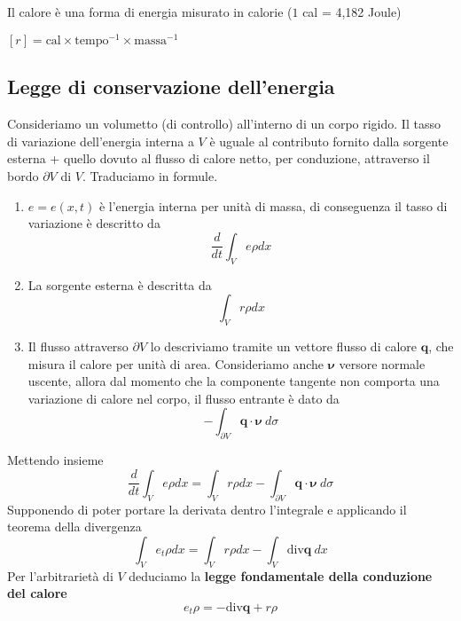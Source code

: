 \documentclass[10pt,a4paper,twoside,openright]{book}
\begin{document}
Il calore è una forma di energia misurato in calorie ($1$ cal = 4,182 Joule)

$[ r] =\text{cal} \times \text{tempo}^{-1} \times \text{massa}^{-1}$
\subsection{Legge di conservazione dell'energia}

Consideriamo un volumetto (di controllo) all'interno di un corpo rigido. Il tasso di variazione dell'energia interna a $V$ è uguale al contributo fornito dalla sorgente esterna + quello dovuto al flusso di calore netto, per conduzione, attraverso il bordo $\partial V$ di $V$. Traduciamo in formule.
\begin{enumerate}
\item $e=e(x,t)$ è l'energia interna per unità di massa, di conseguenza il tasso di variazione è descritto da\begin{equation*}
\frac{d}{dt}\int _{V} e\rho dx
\end{equation*}
\item La sorgente esterna è descritta da\begin{equation*}
\int _{V} r\rho dx
\end{equation*}
\item Il flusso attraverso $\partial V$ lo descriviamo tramite un vettore flusso di calore $\mathbf{q}$, che misura il calore per unità di area. Consideriamo anche $\displaystyle \bm{\nu}$ versore normale uscente, allora dal momento che la componente tangente non comporta una variazione di calore nel corpo, il flusso entrante è dato da\begin{equation*}
-\int _{\partial V}\mathbf{q} \cdotp \bm{\nu} \ d\sigma 
\end{equation*}
\end{enumerate}

Mettendo insieme
\begin{equation*}
\frac{d}{dt}\int _{V} e\rho dx=\int _{V} r\rho dx-\int _{\partial V}\mathbf{q} \cdotp \bm{\nu} \ d\sigma 
\end{equation*}
Supponendo di poter portare la derivata dentro l'integrale e applicando il teorema della divergenza
\begin{equation*}
\int _{V} e_{t} \rho dx=\int _{V} r\rho dx-\int _{V}\mathrm{div}\mathbf{q} \ dx
\end{equation*}
Per l'arbitrarietà di $\displaystyle V$ deduciamo la \textbf{legge fondamentale della conduzione del calore}
\begin{equation*}
\boxed{e_{t} \rho =-\mathrm{div}\mathbf{q} +r\rho }
\end{equation*}
\end{document}
